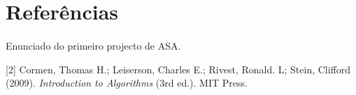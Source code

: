 \documentclass[12pt, a4paper]{article}
\begin{document}
\section{Referências}
\paragraph{}
\indent[1] Enunciado do primeiro projecto de ASA.

[2] Cormen, Thomas H.; Leiserson, Charles E.; Rivest, Ronald. L; Stein, Clifford
(2009). \textit{Introduction to Algorithms} (3rd ed.). MIT Press.
\end{document}
